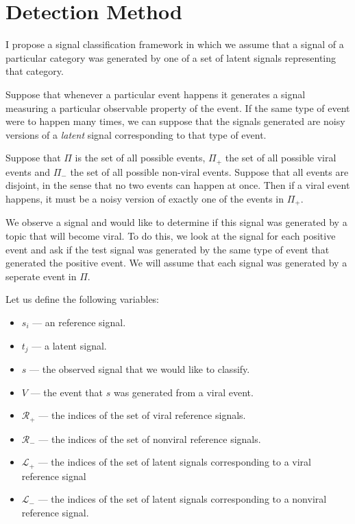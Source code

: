 \chapter{Detection Method}
\label{ch:method}

I propose a signal classification framework in which we assume that a signal of a particular category was generated by one of a set of latent signals representing that category.

Suppose that whenever a particular event happens it generates a signal measuring a particular observable property of the event. If the same type of event were to happen many times, we can suppose that the signals generated are noisy versions of a {\em latent} signal corresponding to that type of event.

Suppose that $\Pi$ is the set of all possible events, $\Pi_+$ the set of all possible viral events and $\Pi_-$ the set of all possible non-viral events. Suppose that all events are disjoint, in the sense that no two events can happen at once. Then if a viral event happens, it must be a noisy version of exactly one of the events in $\Pi_+$.

We observe a signal and would like to determine if this signal was generated by a topic that will become viral. To do this, we look at the signal for each positive event and ask if the test signal was generated by the same type of event that generated the positive event. We will assume that each signal was generated by a seperate event in $\Pi$. 

Let us define the following variables:

\begin{itemize}
\item $s_i$ --- an reference signal.
\item $t_j$ --- a latent signal.
\item $s$ --- the observed signal that we would like to classify.
\item $V$ --- the event that $s$ was generated from a viral event. 
\item $\mathcal{R}_+$ --- the indices of the set of viral reference signals.
\item $\mathcal{R}_-$ --- the indices of the set of nonviral reference signals.
\item $\mathcal{L}_+$ --- the indices of the set of latent signals corresponding to a viral reference signal
\item $\mathcal{L}_-$ --- the indices of the set of latent signals corresponding to a nonviral reference signal.
\end{itemize}

